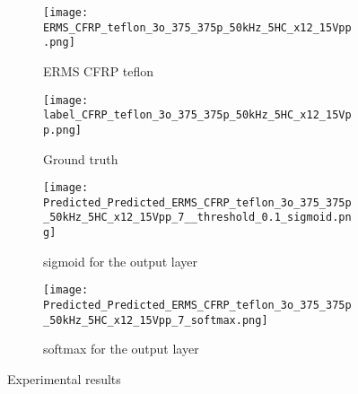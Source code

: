 	\begin{figure} [h!]
		\centering
		\begin{subfigure}[b]{0.47\textwidth}
			\centering
			\texttt{[image: ERMS\_CFRP\_teflon\_3o\_375\_375p\_50kHz\_5HC\_x12\_15Vpp.png]}
			\caption{ERMS CFRP teflon}
			\label{fig:Delamination}
		\end{subfigure}			
		\hfill
		\begin{subfigure}[b]{0.47\textwidth}
		\centering 	
		\texttt{[image: label\_CFRP\_teflon\_3o\_375\_375p\_50kHz\_5HC\_x12\_15Vpp.png]}
		\caption{Ground truth} 
		\label{fig:damage_label}
		\end{subfigure}
		\hfill
		\begin{subfigure}[b]{0.47\textwidth}
			\centering
			\texttt{[image: Predicted\_Predicted\_ERMS\_CFRP\_teflon\_3o\_375\_375p\_50kHz\_5HC\_x12\_15Vpp\_7\_\_threshold\_0.1\_sigmoid.png]}
			\caption{sigmoid for the output layer} 
			\label{fig:EXP_predict_sigmoid}
		\end{subfigure}
		\hfill
		\begin{subfigure}[b]{0.47\textwidth}
			\centering
			\texttt{[image: Predicted\_Predicted\_ERMS\_CFRP\_teflon\_3o\_375\_375p\_50kHz\_5HC\_x12\_15Vpp\_7\_softmax.png]}
			\caption{softmax for the output layer} 
			\label{fig:EXP_predict_softmax}
		\end{subfigure}
			\caption{Experimental results}
			\label{}
		\end{figure}
	
